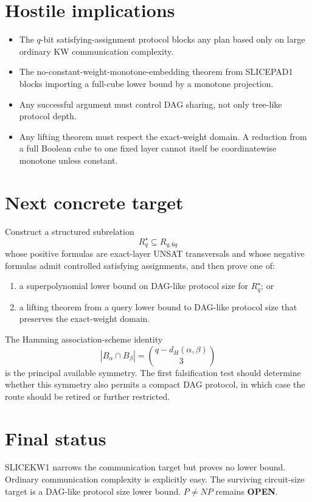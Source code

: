 \documentclass[11pt]{article}
\begin{document}
\section{Hostile implications}

\begin{itemize}
\item[] The \(q\)-bit satisfying-assignment protocol blocks any plan based only on large ordinary KW communication complexity.
\item[] The no-constant-weight-monotone-embedding theorem from SLICEPAD1 blocks importing a full-cube lower bound by a monotone projection.
\item[] Any successful argument must control DAG sharing, not only tree-like protocol depth.
\item[] Any lifting theorem must respect the exact-weight domain.  A reduction from a full Boolean cube to one fixed layer cannot itself be coordinatewise monotone unless constant.
\end{itemize}

\section{Next concrete target}

Construct a structured subrelation
\[
R^\star_{q}\subseteq R_{q,6q}
\]
whose positive formulas are exact-layer UNSAT transversals and whose negative formulas admit controlled
satisfying assignments, and then prove one of:

\begin{enumerate}
\item a superpolynomial lower bound on DAG-like protocol size for \(R^\star_q\); or
\item a lifting theorem from a query lower bound to DAG-like protocol size that preserves the exact-weight domain.
\end{enumerate}

The Hamming association-scheme identity
\[
|B_\alpha\cap B_\beta|
=
\binom{q-d_H(\alpha,\beta)}3
\]
is the principal available symmetry.  The first falsification test should determine whether this symmetry also permits a compact DAG protocol, in which case the route should be retired or further restricted.

\section{Final status}

SLICEKW1 narrows the communication target but proves no lower bound.  Ordinary communication complexity is explicitly easy.  The surviving circuit-size target is a DAG-like protocol size lower bound.  \(P\ne NP\) remains \textbf{OPEN}.
\end{document}
